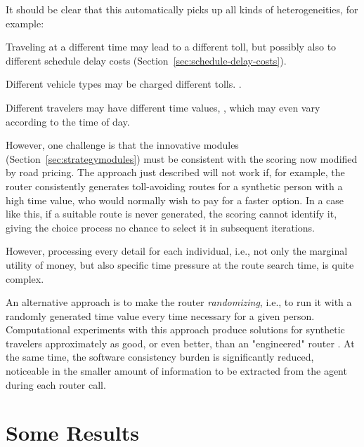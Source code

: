 It should be clear that this automatically picks up all kinds of heterogeneities, for example:
\begin{compactitem}
\item Traveling at a different time may lead to a different toll, but possibly also to different schedule delay costs (Section~\ref{sec:schedule-delay-costs}). 
\item Different vehicle types may be charged different tolls. \citep{KickhoeferNagel2012EmissionInternalization}.
\item Different travelers may have different time values, \citep{NagelKickhoeferJoubert2014HeterogeneousVoTsPROCEDIA}, which may even vary according to the time of day.
\end{compactitem}

However, one challenge is that the innovative modules (Section~\ref{sec:strategymodules}) must be consistent with the scoring now modified by road pricing. The approach just described will not work if, for example, the router consistently generates toll-avoiding routes for a synthetic person with a high time value,  who would normally wish to pay for a faster option. In a case like this, if a suitable route is never generated, the scoring cannot identify it, giving  the choice process no chance to select it in subsequent iterations.

However, processing every detail for each individual, i.e., not only the marginal utility of money, but also specific time pressure at the route search time, is quite complex.

An alternative approach is to make the router \emph{randomizing}, i.e., to run it with a randomly generated time value every time necessary for a given person. Computational experiments with this approach produce solutions for synthetic travelers approximately as good, or even better, than an "engineered" router \citep{NagelKickhoeferJoubert2014HeterogeneousVoTsPROCEDIA}. At the same time, the software consistency burden is significantly reduced, noticeable in the smaller amount of information to be extracted from the agent during each router call.

\section{Some Results}
